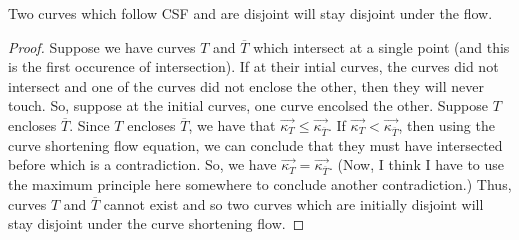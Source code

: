\documentclass{article}
\begin{document}
Two curves which follow CSF and are disjoint will stay disjoint under the flow.
\begin{proof}
    Suppose we have curves $T$ and $\overline{T}$ which intersect at a single point (and this is the first occurence of intersection). 
    If at their intial curves, the curves did not intersect and one
    of the curves did not enclose the other, then they will never touch. So, suppose at the initial curves, one curve encolsed the other. Suppose
    $T$ encloses $\overline{T}$. Since $T$ encloses $\overline{T}$, we have that $\vec{\kappa_{T}}\leq \vec{\kappa_{\overline{T}}}$. If 
    $\vec{\kappa_{T}} < \vec{\kappa_{\overline{T}}}$, then using the curve shortening flow equation, we can conclude that they must have intersected
    before which is a contradiction. So, we have $\vec{\kappa_T} = \vec{\kappa_{\overline{T}}}$. (Now, I think I have to use the maximum principle
    here somewhere to conclude another contradiction.) Thus, curves $T$ and $\overline{T}$ cannot exist and so two curves which are initially disjoint
    will stay disjoint under the curve shortening flow.
\end{proof}
\end{document}
